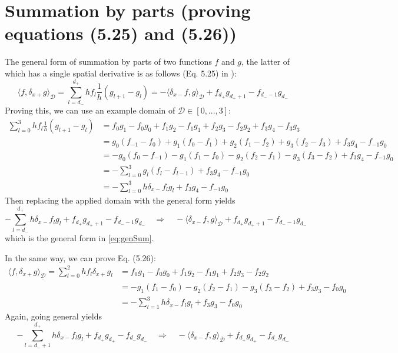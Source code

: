 \documentclass[dvipsnames]{article}
\begin{document}
\section{Summation by parts (proving equations (5.25) and (5.26))}\label{app:summation}
The general form of summation by parts of two functions $f$ and $g$, the latter of which has a single spatial derivative is as follows (Eq. 5.25) in \cite{Bilbao2009}):
\begin{equation}\label{eq:genSum}
    \langle f, \delta_{x+}g \rangle_\mathcal{D} = \sum_{l=d_-}^{d_+}hf_l\frac{1}{h}(g_{l+1}-g_l) = -\langle \delta_{x-}f, g\rangle_\mathcal{D} + f_{d_+}g_{d_++1} - f_{d_--1}g_{d_-}
\end{equation}
Proving this, we can use an example domain of $\mathcal{D}\in[0,...,3]$:
\begin{equation}
    \begin{aligned}
        \sum_{l=0}^3hf_l\frac{1}{h}(g_{l+1}-g_l) &= f_0g_1-f_0g_0 + f_1g_2-f_1g_1 + f_2g_3-f_2g_2 + f_3g_4-f_3g_3\\
        &= g_0(f_{-1}-f_0) + g_1(f_0-f_1) + g_2(f_1-f_2) + g_3(f_2-f_3) + f_3g_4 - f_{-1}g_0 \\
        &= -g_0(f_0-f_{-1}) - g_1(f_1-f_0) - g_2(f_2-f_1) - g_3(f_3-f_2) + f_3g_4 - f_{-1}g_0\\
        &= -\sum_{l=0}^3 g_l(f_l-f_{l-1}) + f_3g_4 - f_{-1}g_0\\
        &= -\sum_{l=0}^3 h\delta_{x-}f_lg_l + f_3g_4 - f_{-1}g_0
    \end{aligned}
\end{equation}
Then replacing the applied domain with the general form yields
\begin{equation}
    -\sum_{l=d_-}^{d_+}h\delta_{x-}f_lg_l + f_{d_+}g_{d_++1} - f_{d_--1}g_{d_-} \quad \Rightarrow \quad -\langle \delta_{x-}f, g\rangle_\mathcal{D} + f_{d_+}g_{d_++1} - f_{d_--1}g_{d_-}
\end{equation}
which is the general form in \eqref{eq:genSum}.

In the same way, we can prove Eq. (5.26):
\begin{equation}
    \begin{aligned}
    \langle f,\delta_{x+}g\rangle_{\underline{\mathcal{D}}}=\sum_{l=0}^2hf_l\delta_{x+}g_l &= f_0g_1-f_0g_0 + f_1g_2-f_1g_1 + f_2g_3-f_2g_2 \\
    &= - g_1(f_1-f_0) - g_2(f_2-f_1) - g_3(f_3-f_2) + f_3g_3 - f_0g_0
    \\
    &= -\sum_{l=1}^3h\delta_{x-}f_lg_l + f_3g_3 - f_0g_0
    \end{aligned}
\end{equation}
Again, going general yields
\begin{equation}
    -\sum_{l=d_-+1}^{d_+}h\delta_{x-}f_lg_l + f_{d_+}g_{d_+}-f_{d_-}g_{d_-} \quad \Rightarrow \quad -\langle \delta_{x-}f,g\rangle_{\overline{\mathcal{D}}} + f_{d_+}g_{d_+}-f_{d_-}g_{d_-}
\end{equation}
\end{document}
